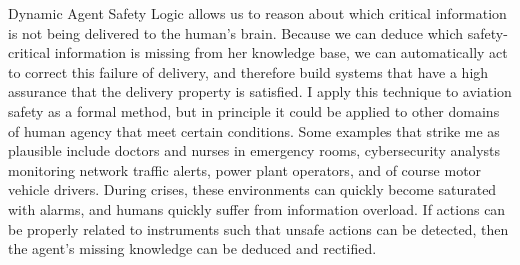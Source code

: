 Dynamic Agent Safety Logic allows us to reason about which critical information is not being delivered to the human's brain. Because we can deduce which safety-critical information is missing from her knowledge base, we can automatically act to correct this failure of delivery, and therefore build systems that have a high assurance that the delivery property is satisfied. I apply this technique to aviation safety as a formal method, but in principle it could be applied to other domains of human agency that meet certain conditions. Some examples that strike me as plausible include doctors and nurses in emergency rooms, cybersecurity analysts monitoring network traffic alerts, power plant operators, and of course motor vehicle drivers. During crises, these environments can quickly become saturated with alarms, and humans quickly suffer from information overload. If actions can be properly related to instruments such that unsafe actions can be detected, then the agent's missing knowledge can be deduced and rectified.


